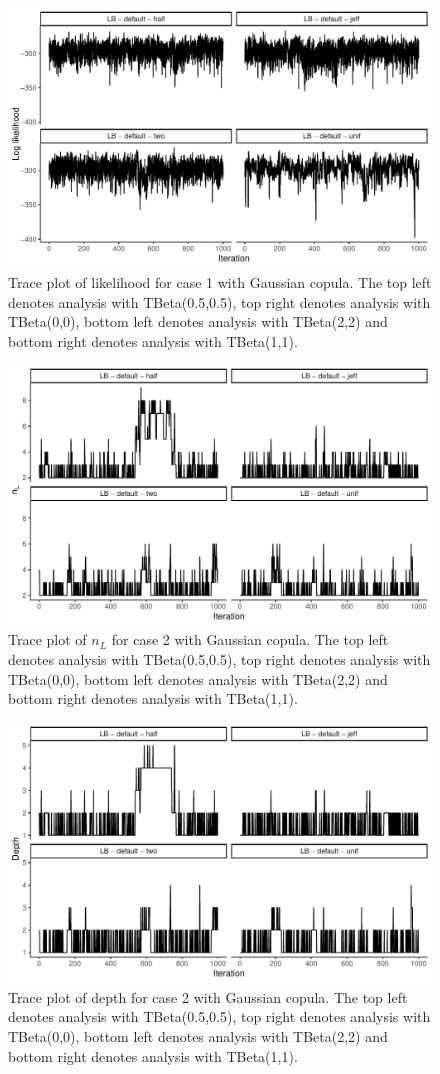 \documentclass{amsart}
\begin{document}
\begin{figure}
	\centering
	\includegraphics[width = 0.75\linewidth]{trace_case1_gauss_like.pdf}
	\caption{Trace plot of likelihood for case 1 with Gaussian copula. The top left denotes analysis with TBeta(0.5,0.5), top right denotes analysis with TBeta(0,0), bottom left denotes analysis with TBeta(2,2) and bottom right denotes analysis with TBeta(1,1).}
	\label{fig:case1:gauss:like}
\end{figure}

\begin{figure}
	\centering
	\includegraphics[width = 0.75\linewidth]{trace_case2_gauss_nterm.pdf}
	\caption{Trace plot of $n_L$ for case 2 with Gaussian copula. The top left denotes analysis with TBeta(0.5,0.5), top right denotes analysis with TBeta(0,0), bottom left denotes analysis with TBeta(2,2) and bottom right denotes analysis with TBeta(1,1).}
	\label{fig:case2:gauss:nterm}
\end{figure}

\begin{figure}
	\centering
	\includegraphics[width = 0.75\linewidth]{trace_case2_gauss_depth.pdf}
	\caption{Trace plot of depth for case 2 with Gaussian copula. The top left denotes analysis with TBeta(0.5,0.5), top right denotes analysis with TBeta(0,0), bottom left denotes analysis with TBeta(2,2) and bottom right denotes analysis with TBeta(1,1).}
	\label{fig:case2:gauss:depth}
\end{figure}
\end{document}
